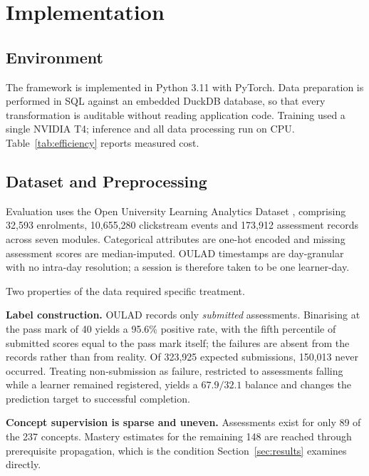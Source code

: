 \documentclass[conference]{IEEEtran}
\begin{document}
\section{Implementation}
\label{sec:implementation}

\subsection{Environment}

The framework is implemented in Python 3.11 with PyTorch. Data preparation is performed
in SQL against an embedded DuckDB database, so that every transformation is auditable
without reading application code. Training used a single NVIDIA T4; inference and all
data processing run on CPU. Table~\ref{tab:efficiency} reports measured cost.

\subsection{Dataset and Preprocessing}

Evaluation uses the Open University Learning Analytics Dataset \cite{kuzilek2017oulad},
comprising 32{,}593 enrolments, 10{,}655{,}280 clickstream events and 173{,}912
assessment records across seven modules. Categorical attributes are one-hot encoded and
missing assessment scores are median-imputed. OULAD timestamps are day-granular with no
intra-day resolution; a session is therefore taken to be one learner-day.

Two properties of the data required specific treatment.

\textbf{Label construction.} OULAD records only \emph{submitted} assessments. Binarising
at the pass mark of 40 yields a 95.6\% positive rate, with the fifth percentile of
submitted scores equal to the pass mark itself; the failures are absent from the
records rather than from reality. Of 323{,}925 expected submissions, 150{,}013 never
occurred. Treating non-submission as failure, restricted to assessments falling while a
learner remained registered, yields a $67.9/32.1$ balance and changes the prediction
target to successful completion.

\textbf{Concept supervision is sparse and uneven.} Assessments exist for only 89 of the
237 concepts. Mastery estimates for the remaining 148 are reached through prerequisite
propagation, which is the condition Section~\ref{sec:results} examines directly.
\end{document}
